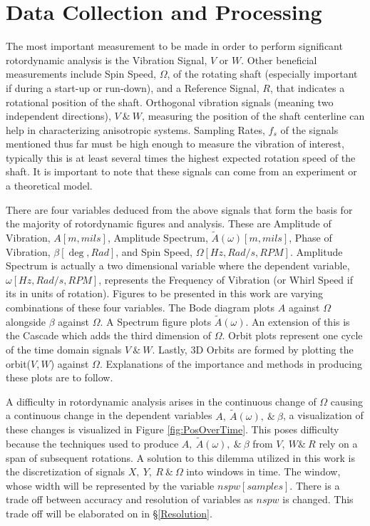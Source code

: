 \section{Data Collection and Processing}
The most important measurement to be made in order to perform significant rotordynamic analysis is the Vibration Signal, $ V $ or $ W $. Other beneficial measurements include Spin Speed, $ \Omega $, of the rotating shaft (especially important if during a start-up or run-down), and a Reference Signal, $ R $, that indicates a rotational position of the shaft. Orthogonal vibration signals (meaning two independent directions), $ V\ \&\ W $, measuring the position of the shaft centerline can help in characterizing anisotropic systems. Sampling Rates, $ f_s $ of the signals mentioned thus far must be high enough to measure the vibration of interest, typically this is at least several times the highest expected rotation speed of the shaft. It is important to note that these signals can come from an experiment or a theoretical model.\par
There are four variables deduced from the above signals that form the basis for the majority of rotordynamic figures and analysis. These are Amplitude of Vibration, $ A[m,mils] $, Amplitude Spectrum, $ \tilde{A}(\omega)[m,mils] $, Phase of Vibration, $ \beta[\deg,Rad] $, and Spin Speed, $ \Omega[Hz,Rad/s,RPM] $. Amplitude Spectrum is actually a two dimensional variable where the dependent variable, $ \omega[Hz,Rad/s,RPM] $, represents the Frequency of Vibration (or Whirl Speed if its in units of rotation). Figures to be presented in this work are varying combinations of these four variables. The Bode diagram plots $ A $ against $ \Omega $ alongside $ \beta $  against $ \Omega $. A Spectrum figure plots $ \tilde{A}(\omega) $. An extension of this is the Cascade which adds the third dimension of $ \Omega $. Orbit plots represent one cycle of the time domain signals $ V\ \&\ W $. Lastly, 3D Orbits are formed by plotting the orbit($ V,W $) against $ \Omega $. Explanations of the importance and methods in producing these plots are to follow. \par
A difficulty in rotordynamic analysis arises in the continuous change of $ \Omega $ causing a continuous change in the dependent variables $ A,\ \tilde{A}(\omega),\ \&\ \beta $, a visualization of these changes is visualized in Figure \ref{fig:PosOverTime}. This poses difficulty because the techniques used to produce $ A,\ \tilde{A}(\omega),\ \&\ \beta $ from $ V,\ W\&\ R $ rely on a span of subsequent rotations. A solution to this dilemma utilized in this work is the discretization of signals $ X,\ Y,\ R\ \&\ \Omega $ into windows in time. The window, whose width will be represented by the variable $ nspw[samples] $. There is a trade off between accuracy and resolution of variables as $ nspw $ is changed. This trade off will be elaborated on in \S\ref{Resolution}.\par 
